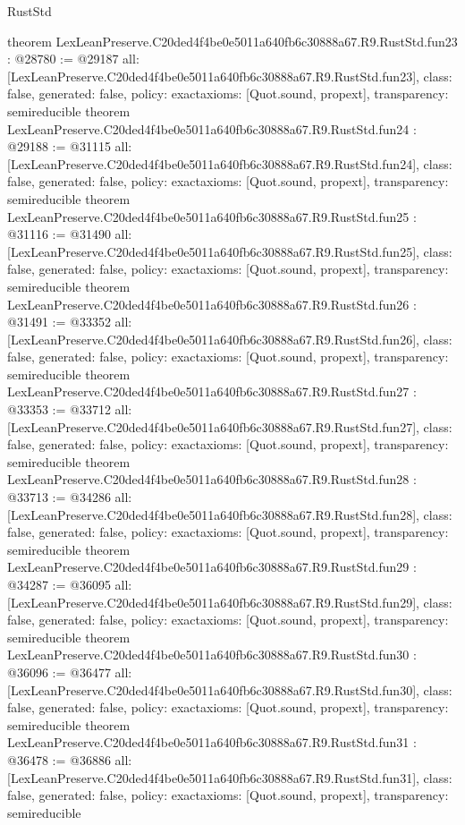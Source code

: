 \begin{lexlean}{RustStd}
\begin{coremodule}
{}
theorem LexLeanPreserve.C20ded4f4be0e5011a640fb6c30888a67.R9.RustStd.fun23 : @28780 := @29187 {
  all: [LexLeanPreserve.C20ded4f4be0e5011a640fb6c30888a67.R9.RustStd.fun23],
  class: false,
  generated: false,
  policy: exact{axioms: [Quot.sound, propext]},
  transparency: semireducible
}
theorem LexLeanPreserve.C20ded4f4be0e5011a640fb6c30888a67.R9.RustStd.fun24 : @29188 := @31115 {
  all: [LexLeanPreserve.C20ded4f4be0e5011a640fb6c30888a67.R9.RustStd.fun24],
  class: false,
  generated: false,
  policy: exact{axioms: [Quot.sound, propext]},
  transparency: semireducible
}
theorem LexLeanPreserve.C20ded4f4be0e5011a640fb6c30888a67.R9.RustStd.fun25 : @31116 := @31490 {
  all: [LexLeanPreserve.C20ded4f4be0e5011a640fb6c30888a67.R9.RustStd.fun25],
  class: false,
  generated: false,
  policy: exact{axioms: [Quot.sound, propext]},
  transparency: semireducible
}
theorem LexLeanPreserve.C20ded4f4be0e5011a640fb6c30888a67.R9.RustStd.fun26 : @31491 := @33352 {
  all: [LexLeanPreserve.C20ded4f4be0e5011a640fb6c30888a67.R9.RustStd.fun26],
  class: false,
  generated: false,
  policy: exact{axioms: [Quot.sound, propext]},
  transparency: semireducible
}
theorem LexLeanPreserve.C20ded4f4be0e5011a640fb6c30888a67.R9.RustStd.fun27 : @33353 := @33712 {
  all: [LexLeanPreserve.C20ded4f4be0e5011a640fb6c30888a67.R9.RustStd.fun27],
  class: false,
  generated: false,
  policy: exact{axioms: [Quot.sound, propext]},
  transparency: semireducible
}
theorem LexLeanPreserve.C20ded4f4be0e5011a640fb6c30888a67.R9.RustStd.fun28 : @33713 := @34286 {
  all: [LexLeanPreserve.C20ded4f4be0e5011a640fb6c30888a67.R9.RustStd.fun28],
  class: false,
  generated: false,
  policy: exact{axioms: [Quot.sound, propext]},
  transparency: semireducible
}
theorem LexLeanPreserve.C20ded4f4be0e5011a640fb6c30888a67.R9.RustStd.fun29 : @34287 := @36095 {
  all: [LexLeanPreserve.C20ded4f4be0e5011a640fb6c30888a67.R9.RustStd.fun29],
  class: false,
  generated: false,
  policy: exact{axioms: [Quot.sound, propext]},
  transparency: semireducible
}
theorem LexLeanPreserve.C20ded4f4be0e5011a640fb6c30888a67.R9.RustStd.fun30 : @36096 := @36477 {
  all: [LexLeanPreserve.C20ded4f4be0e5011a640fb6c30888a67.R9.RustStd.fun30],
  class: false,
  generated: false,
  policy: exact{axioms: [Quot.sound, propext]},
  transparency: semireducible
}
theorem LexLeanPreserve.C20ded4f4be0e5011a640fb6c30888a67.R9.RustStd.fun31 : @36478 := @36886 {
  all: [LexLeanPreserve.C20ded4f4be0e5011a640fb6c30888a67.R9.RustStd.fun31],
  class: false,
  generated: false,
  policy: exact{axioms: [Quot.sound, propext]},
  transparency: semireducible
}
\end{coremodule}
\end{lexlean}
